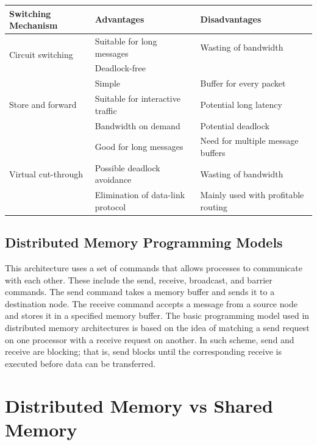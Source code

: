 \documentclass[11pt]{article}
\begin{document}
\begin{adjustwidth}{-1in}{-1in} 
\begin{center}
\begin{tabular}{ |l|l|l| } 
\hline
 Switching Mechanism & Advantages & Disadvantages \\ 
\hline
\multirow{2}{8em}{Circuit switching} & Suitable for long messages & Wasting of bandwidth \\ & Deadlock-free & \\ 
\hline
\multirow{3}{8em}{Store and forward} & Simple & Buffer for every packet  \\
& Suitable for interactive traffic & Potential long latency \\ 
& Bandwidth on demand & Potential deadlock \\ 
\hline
\multirow{3}{8em}{Virtual cut-through} & Good for long messages & Need for multiple message
buffers  \\
& Possible deadlock avoidance & Wasting of bandwidth \\ 
& Elimination of data-link
protocol & Mainly used with
profitable routing \\ 
\hline
\end{tabular}
\end{center}
\end{adjustwidth}

\subsection{Distributed Memory Programming Models}
This architecture uses a set of commands that allows processes to
communicate with each other. These include the send, receive, broadcast, and barrier
commands. The send command takes a memory buffer and sends it to a destination
node. The receive command accepts a message from a source node and stores it in a
specified memory buffer. The basic programming model used in distributed memory architectures is based on the idea of matching a send request on one processor with a receive request on another. 
In such scheme, send and receive are blocking; that is, send blocks until the corresponding receive is executed before data can be transferred.




\section{Distributed Memory vs Shared Memory}
\end{document}
